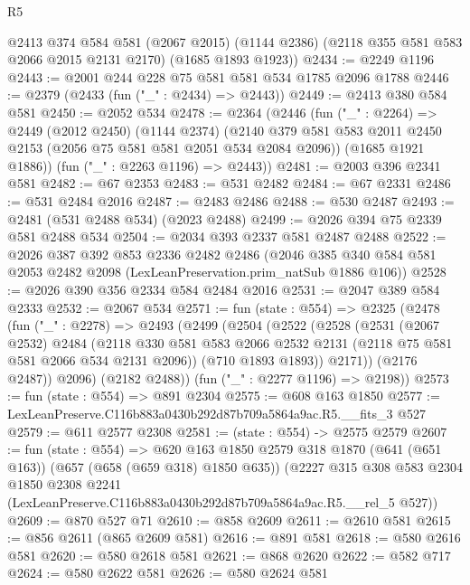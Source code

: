 \begin{lexlean}{R5}
\begin{coremodule}
    @2413
      @374
      @584
      @581
      (@2067 @2015)
      (@1144 @2386)
      (@2118 @355 @581 @583 @2066 @2015 @2131 @2170)
      (@1685 @1893 @1923))
@2434 := @2249 @1196
@2443 := @2001 @244 @228 @75 @581 @581 @534 @1785 @2096 @1788
@2446 := @2379 (@2433 (fun ("_" : @2434) => @2443))
@2449 := @2413 @380 @584 @581
@2450 := @2052 @534
@2478 := @2364
    (@2446
      (fun ("_" : @2264) =>
      @2449
        (@2012 @2450)
        (@1144 @2374)
        (@2140 @379 @581 @583 @2011 @2450 @2153 (@2056 @75 @581 @581 @2051 @534 @2084 @2096))
        (@1685 @1921 @1886))
      (fun ("_" : @2263 @1196) => @2443))
@2481 := @2003 @396 @2341 @581
@2482 := @67 @2353
@2483 := @531 @2482
@2484 := @67 @2331
@2486 := @531 @2484 @2016
@2487 := @2483 @2486
@2488 := @530 @2487
@2493 := @2481 (@531 @2488 @534) (@2023 @2488)
@2499 := @2026 @394 @75 @2339 @581 @2488 @534
@2504 := @2034 @393 @2337 @581 @2487 @2488
@2522 := @2026
    @387
    @392
    @853
    @2336
    @2482
    @2486
    (@2046 @385 @340 @584 @581 @2053 @2482 @2098 (LexLeanPreservation.prim_natSub @1886 @106))
@2528 := @2026 @390 @356 @2334 @584 @2484 @2016
@2531 := @2047 @389 @584 @2333
@2532 := @2067 @534
@2571 := fun (state : @554) =>
  @2325
    (@2478
      (fun ("_" : @2278) =>
      @2493
        (@2499
          (@2504
            (@2522
              (@2528
                (@2531
                  (@2067 @2532)
                  @2484
                  (@2118
                    @330
                    @581
                    @583
                    @2066
                    @2532
                    @2131
                    (@2118 @75 @581 @581 @2066 @534 @2131 @2096))
                  (@710 @1893 @1893))
                @2171))
            (@2176 @2487))
          @2096)
        (@2182 @2488))
      (fun ("_" : @2277 @1196) => @2198))
@2573 := fun (state : @554) => @891 @2304
@2575 := @608 @163 @1850
@2577 := LexLeanPreserve.C116b883a0430b292d87b709a5864a9ac.R5.__fits_3 @527
@2579 := @611 @2577 @2308
@2581 := (state : @554) -> @2575 @2579
@2607 := fun (state : @554) =>
  @620
    @163
    @1850
    @2579
    @318
    @1870
    (@641 (@651 @163))
    (@657 (@658 (@659 @318) @1850 @635))
    (@2227
      @315
      @308
      @583
      @2304
      @1850
      @2308
      @2241
      (LexLeanPreserve.C116b883a0430b292d87b709a5864a9ac.R5.__rel_5 @527))
@2609 := @870 @527 @71
@2610 := @858 @2609
@2611 := @2610 @581
@2615 := @856 @2611 (@865 @2609 @581)
@2616 := @891 @581
@2618 := @580 @2616 @581
@2620 := @580 @2618 @581
@2621 := @868 @2620
@2622 := @582 @717
@2624 := @580 @2622 @581
@2626 := @580 @2624 @581

\end{coremodule}
\end{lexlean}
